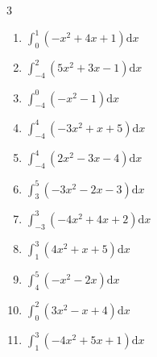 \begin{multicols}{3}
\begin{enumerate}
  \item $\displaystyle \int_{0}^{1}\left( -x^{2}+4x+1 \right) \mathrm{d}x$


  \item $\displaystyle \int_{-4}^{2}\left( 5x^{2}+3x-1 \right) \mathrm{d}x$

        \phantom{$\displaystyle =101$}

  \item $\displaystyle \int_{-4}^{0}\left( -x^{2}-1 \right) \mathrm{d}x$

        \phantom{$\displaystyle =-22$}

\columnbreak %

  \item $\displaystyle \int_{-4}^{4}\left( -3x^{2}+x+5 \right) \mathrm{d}x$


  \item $\displaystyle \int_{-4}^{4}\left( 2x^{2}-3x-4 \right) \mathrm{d}x$

        \phantom{$\displaystyle =80$}

  \item $\displaystyle \int_{3}^{5}\left( -3x^{2}-2x-3 \right) \mathrm{d}x$

        \phantom{$\displaystyle =-115$}

  \item $\displaystyle \int_{-3}^{3}\left( -4x^{2}+4x+2 \right) \mathrm{d}x$

        \phantom{$\displaystyle =-70$}

  \item $\displaystyle \int_{1}^{3}\left( 4x^{2}+x+5 \right) \mathrm{d}x$


\columnbreak %

  \item $\displaystyle \int_{4}^{5}\left( -x^{2}-2x \right) \mathrm{d}x$


  \item $\displaystyle \int_{0}^{2}\left( 3x^{2}-x+4 \right) \mathrm{d}x$


  \item $\displaystyle \int_{1}^{3}\left( -4x^{2}+5x+1 \right) \mathrm{d}x$


\end{enumerate}
\end{multicols}
